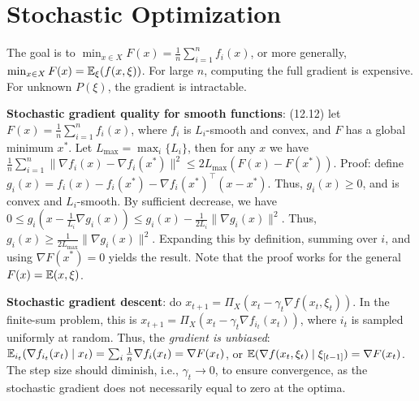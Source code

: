 \section{Stochastic Optimization}

The goal is to $\min_{x \in X} F(x) = \frac{1}{n}\sum_{i=1}^n f_i(x)$, or more generally, $\min_{x \in X} F(x) = \mathbb{E}_\xi (f(x, \xi))$. For large $n$, computing the full gradient is expensive. For unknown $P(\xi)$, the gradient is intractable.

\textbf{Stochastic gradient quality for smooth functions}: (12.12) let $F(x)=\frac{1}{n}\sum_{i=1}^n f_i(x)$, where $f_i$ is $L_i$-smooth and convex, and $F$ has a global minimum $x^*$. Let $L_{\text{max}} = \max_i\{L_i\}$, then for any $x$ we have $\frac{1}{n}\sum_{i=1}^n \|\nabla f_i(x) - \nabla f_i(x^*)\|^2 \le 2L_{\text{max}}(F(x) - F(x^*))$. Proof: define $g_i(x) = f_i(x) - f_i(x^*) - \nabla f_i(x^*)^\top (x-x^*)$. Thus, $g_i(x)\ge 0$, and is convex and $L_i$-smooth. By sufficient decrease, we have $0\le g_i(x - \frac{1}{L_i}\nabla g_i(x)) \le g_i(x) - \frac{1}{2L_i}\|\nabla g_i(x)\|^2$. Thus, $g_i(x) \ge \frac{1}{2L_{\text{max}}}\|\nabla g_i(x)\|^2$. Expanding this by definition, summing over $i$, and using $\nabla F(x^*)=0$ yields the result. Note that the proof works for the general $F(x) = \mathbb{E}(x,\xi)$.

\textbf{Stochastic gradient descent}: do $x_{t+1} = \Pi_X (x_t - \gamma_t \nabla f(x_t, \xi_t))$. In the finite-sum problem, this is $x_{t+1} = \Pi_X(x_t - \gamma_t \nabla f_{i_t}(x_t))$, where $i_t$ is sampled uniformly at random. Thus, the \emph{gradient is unbiased}: $\mathbb{E}_{i_t} (\nabla f_{i_t} (x_t) \mid x_t) = \sum_i \frac{1}{n} \nabla f_i (x_t) = \nabla F(x_t)$, or $\mathbb{E}(\nabla f(x_t, \xi_t) \mid \xi_{[t-1]}) = \nabla F(x_t)$. The step size should diminish, i.e., $\gamma_t \rightarrow 0$, to ensure convergence, as the stochastic gradient does not necessarily equal to zero at the optima.

